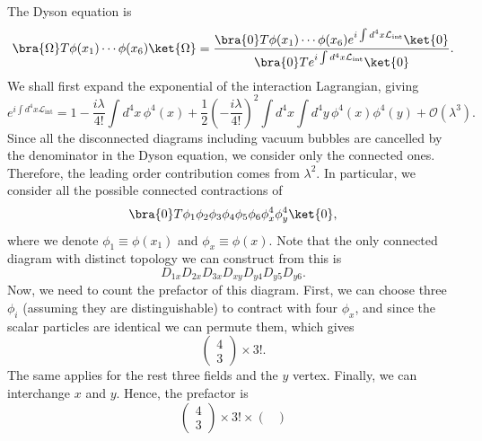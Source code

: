 \begin{solution}
    The Dyson equation is 
    \begin{equation}
        \bra{\Omega}T\phi(x_1)\cdots\phi(x_6)\ket{\Omega} = \frac{\bra{0}T\phi(x_1)\cdots\phi(x_6)e^{i\int d^4x\mathcal{L}_\text{int}}\ket{0}}{\bra{0}Te^{i\int d^4x\mathcal{L}_\text{int}}\ket{0}}.
    \end{equation}
    We shall first expand the exponential of the interaction Lagrangian, giving
    \begin{equation}
        e^{i\int d^4x\mathcal{L}_\text{int}} = 1 -\frac{i\lambda}{4!}\int d^4x\,\phi^4(x) + \frac{1}{2}\left(-\frac{i\lambda}{4!}\right)^2\int d^4x\int d^4y \,\phi^4(x)\phi^4(y) +\mathcal{O}(\lambda^3).
    \end{equation}
    Since all the disconnected diagrams including vacuum bubbles are cancelled by the denominator in the Dyson equation, we consider only the connected ones. Therefore, the leading order contribution comes from $\lambda^2$. In particular, we consider all the possible connected contractions of 
    \begin{equation}
        \bra{0}T\phi_1\phi_2\phi_3\phi_4\phi_5\phi_6\phi_x^4\phi_y^4\ket{0},
    \end{equation}
    where we denote $\phi_1 \equiv \phi(x_1)$ and $\phi_x\equiv\phi(x)$. Note that the only connected diagram with distinct topology we can construct from this is
    \begin{equation}
        D_{1x}D_{2x}D_{3x}D_{xy}D_{y4}D_{y5}D_{y6}.
    \end{equation}
    Now, we need to count the prefactor of this diagram. First, we can choose three $\phi_i$ (assuming they are distinguishable) to contract with four $\phi_x$, and since the scalar particles are identical we can permute them, which gives
    \begin{equation}
        \begin{pmatrix}
            4\\3
        \end{pmatrix}\times 3!.
    \end{equation}
    The same applies for the rest three fields and the $y$ vertex. Finally, we can interchange $x$ and $y$. Hence, the prefactor is
    \begin{equation}
        \begin{pmatrix}
            4\\3
        \end{pmatrix}\times 3! \times\begin{pmatrix}

\end{pmatrix}
\end{equation}
\end{solution}

